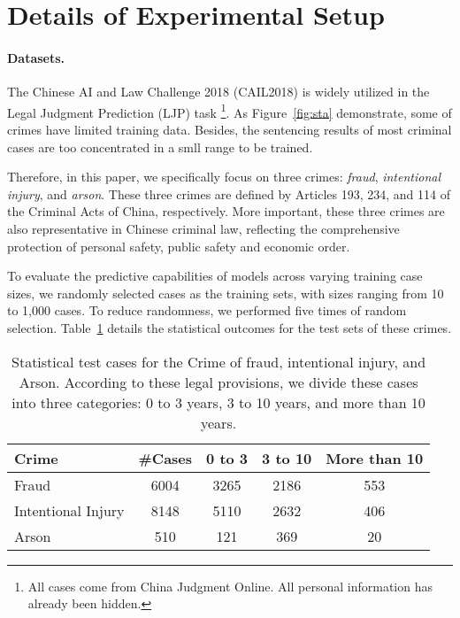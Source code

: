 \section{Details of Experimental Setup}
\label{sec:d}

\paragraph{Datasets.} The Chinese AI and Law Challenge 2018 (CAIL2018) is widely utilized in the Legal Judgment Prediction (LJP) task \cite{DBLP:journals/corr/abs-1807-02478}\footnote{All cases come from China Judgment Online. All personal information has already been hidden.}. As Figure~\ref{fig:sta} demonstrate, some of crimes have limited training data. Besides, the sentencing results of most criminal cases are too concentrated in a smll range to be trained.

Therefore, in this paper, we specifically focus on three crimes: \textit{fraud}, \textit{intentional injury}, and \textit{arson}. These three crimes are defined by Articles 193, 234, and 114 of the Criminal Acts of China, respectively. More important, these three crimes are also representative in Chinese criminal law, reflecting the comprehensive protection of personal safety, public safety and economic order. 

To evaluate the predictive capabilities of models across varying training case sizes, we randomly selected cases as the training sets, with sizes ranging from 10 to 1,000 cases. To reduce randomness, we performed five times of random selection. Table~\ref{tab:test} details the statistical outcomes for the test sets of these crimes.

\begin{table}
    \centering
    \small
    \caption{Statistical test cases for the Crime of fraud, intentional injury, and Arson. 
    According to these legal provisions, we divide these cases into three categories: 0 to 3 years, 3 to 10 years, and more than 10 years.}
    \begin{tabular}{p{}cccc}
    \toprule
      Crime & \#Cases & 0 to 3 & 3 to 10&More than 10\\
      \hline
    Fraud & 6004 & 3265 & 2186 & 553\\
    Intentional Injury & 8148 & 5110 & 2632 & 406\\
    Arson & 510 & 121 & 369 & 20\\
    \bottomrule
    \end{tabular}
    \label{tab:test}
\end{table}

